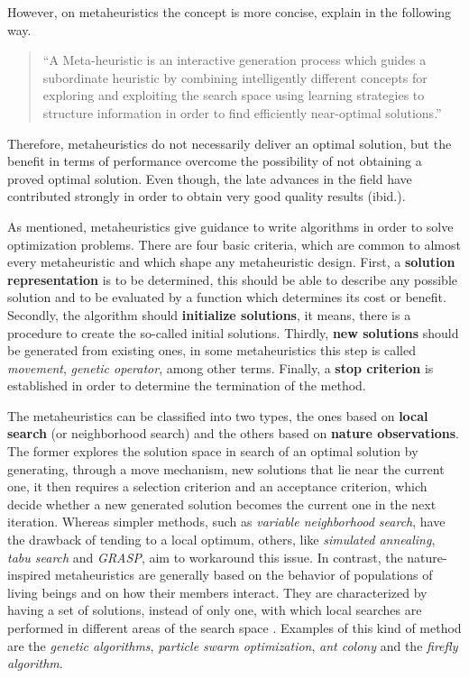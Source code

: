 \documentclass[tuberlin,cic,tc,openright,english,noabntcite,oneside]{iiufrgs}
\begin{document}
However, on metaheuristics the concept is more concise, \textcite[p. 3]{osman_meta-heuristics:_2012} explain in the following way.

\begin{quote}
\enquote{A Meta-heuristic is an interactive generation process which guides a subordinate heuristic by combining intelligently different concepts for exploring and exploiting the search space using learning strategies to structure information in order to find efficiently near-optimal solutions.}
\end{quote}

Therefore, metaheuristics do not necessarily deliver an optimal solution, but the benefit in terms of performance overcome the possibility of not obtaining a proved optimal solution. Even though, the late advances in the field have contributed strongly in order to obtain very good quality results (ibid.).

As mentioned, metaheuristics give guidance to write algorithms in order to solve optimization problems. There are four basic criteria, which are common to almost every metaheuristic and which shape any metaheuristic design. First, a \textbf{solution representation} is to be determined, this should be able to describe any possible solution and to be evaluated by a function which determines its cost or benefit. Secondly, the algorithm should \textbf{initialize solutions}, it means, there is a procedure to create the so-called initial solutions. Thirdly, \textbf{new solutions} should be generated from existing ones, in some metaheuristics this step is called \emph{movement}, \emph{genetic operator}, among other terms. Finally, a \textbf{stop criterion} is established in order to determine the termination of the method.

The metaheuristics can be classified into two types, the ones based on \textbf{local search} (or neighborhood search) and the others based on \textbf{nature observations}. The former explores the solution space in search of an optimal solution by generating, through a move mechanism, new solutions that lie near the current one, it then requires a selection criterion and an acceptance criterion, which decide whether a new generated solution becomes the current one in the next iteration. Whereas simpler methods, such as \emph{variable neighborhood search}, have the drawback of tending to a local optimum, others, like \emph{simulated annealing}, \emph{tabu search} and \emph{GRASP}, aim to workaround this issue. In contrast, the nature-inspired metaheuristics are generally based on the behavior of populations of living beings and on how their members interact. They are characterized by having a set of solutions, instead of only one, with which local searches are performed in different areas of the search space \parencite[p. 7]{osman_meta-heuristics:_2012}. Examples of this kind of method are the \emph{genetic algorithms}, \emph{particle swarm optimization}, \emph{ant colony} and the \emph{firefly algorithm}.
\end{document}
